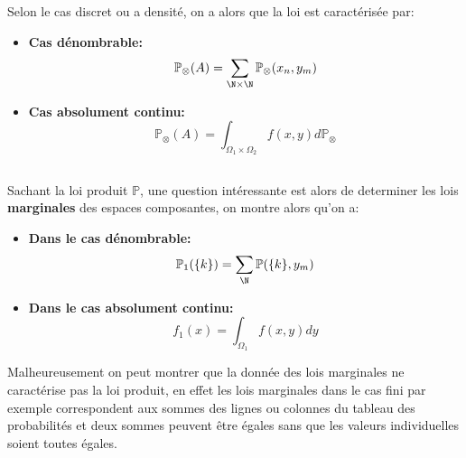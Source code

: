 Selon le cas discret ou a densité, on a alors que la loi est caractérisée par:
\begin{itemize}
   \item \textbf{Cas dénombrable:}
   \[
      \mathbb{P}_\otimes(A) = \sum_{\N \times \N} \mathbb{P}_\otimes(x_n, y_m)
   \]
   \item \textbf{Cas absolument continu:}
   \[
      \mathbb{P}_\otimes(A) = \int_{\Omega_1 \times \Omega_2} f(x, y) d\mathbb{P}_\otimes
   \]
\end{itemize}
\pagebreak
\subsection*{}
Sachant la loi produit \( \mathbb{P} \), une question intéressante est alors de determiner les lois \textbf{marginales} des espaces composantes, on montre alors qu'on a:
\begin{itemize}
   \item \textbf{Dans le cas dénombrable:}
   \[
      \mathbb{P}_1(\{k\}) = \sum_{\N} \mathbb{P}(\{k\}, y_m)
   \]
   \item \textbf{Dans le cas absolument continu:}
   \[
      f_1(x) = \int_{\Omega_1} f(x, y) dy
   \]
\end{itemize}
Malheureusement on peut montrer que la donnée des lois marginales ne caractérise pas la loi produit, en effet les lois marginales dans le cas fini par exemple correspondent aux sommes des lignes ou colonnes du tableau des probabilités et deux sommes peuvent être égales sans que les valeurs individuelles soient toutes égales.
